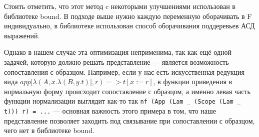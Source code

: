 Стоить отметить, что этот метод c некоторыми улучшениями использован в библиотеке bound\cite{bound}. В подходе выше нужно каждую переменную оборачивать в F индивидуально, в библиотеке использован способ оборачивания поддеревьев АСД выражений.

Однако в нашем случае эта оптимизация неприменима, так как ещё одной задачей, которую должно решать представление --- является возможность сопоставления с образцом. Например, если у нас есть искусственная редукция вида $app[\lambda(A, x.\lambda(B, y.t)], r) => t[x:=r]$, в функции приведения в нормальную форму происходит сопоставление с образцом, а именно левая часть функции нормализации выглядит как-то так \lstinline{nf (App (Lam _ (Scope (Lam _ t))) r) = ...} --- основная важность этого примера в том, что наше представление позволяет заходить под связывание при сопоставлении с образцом, чего нет в библиотеке bound.
